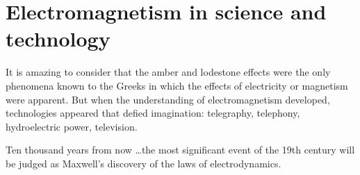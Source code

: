 \section{Electromagnetism in science and technology}

It is amazing to consider that the amber and lodestone effects
were the only phenomena known to the Greeks in which the effects
of electricity or magnetism were apparent.
But when the understanding of electromagnetism developed,
technologies appeared that defied imagination:
telegraphy, telephony, hydroelectric power, television.

Ten thousand years from now \ldots the most significant event of the 19th century
will be judged as Maxwell's discovery of the laws of electrodynamics.

